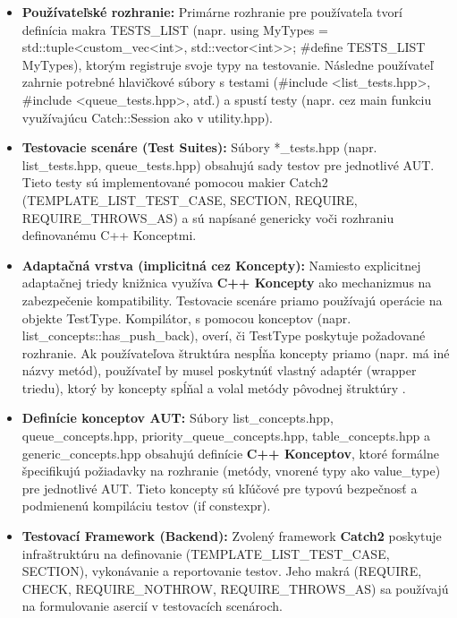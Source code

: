 \documentclass[11pt]{article}
\begin{document}
\begin{itemize}
    \item \textbf{Používateľské rozhranie:} Primárne rozhranie pre používateľa tvorí definícia makra TESTS\_LIST (napr. using MyTypes = std::tuple<custom\_vec<int>, std::vector<int>>; \#define TESTS\_LIST MyTypes), ktorým registruje svoje typy na testovanie. Následne používateľ zahrnie potrebné hlavičkové súbory s testami (\#include <list\_tests.hpp>, \#include <queue\_tests.hpp>, atď.) a spustí testy (napr. cez main funkciu využívajúcu Catch::Session ako v utility.hpp).
    \item \textbf{Testovacie scenáre (Test Suites):} Súbory *\_tests.hpp (napr. list\_tests.hpp, queue\_tests.hpp) obsahujú sady testov pre jednotlivé AUT. Tieto testy sú implementované pomocou makier Catch2 (TEMPLATE\_LIST\_TEST\_CASE, SECTION, REQUIRE, REQUIRE\_THROWS\_AS) a sú napísané genericky voči rozhraniu definovanému C++ Konceptmi.
    \item \textbf{Adaptačná vrstva (implicitná cez Koncepty):} Namiesto explicitnej adaptačnej triedy knižnica využíva \textbf{C++ Koncepty} ako mechanizmus na zabezpečenie kompatibility. Testovacie scenáre priamo používajú operácie na objekte TestType. Kompilátor, s pomocou konceptov (napr. list\_concepts::has\_push\_back), overí, či TestType poskytuje požadované rozhranie. Ak používateľova štruktúra nespĺňa koncepty priamo (napr. má iné názvy metód), používateľ by musel poskytnúť vlastný adaptér (wrapper triedu), ktorý by koncepty spĺňal a volal metódy pôvodnej štruktúry \cite{design_patterns}.
    \item \textbf{Definície konceptov AUT:} Súbory list\_concepts.hpp, queue\_concepts.hpp, priority\_queue\_concepts.hpp, table\_concepts.hpp a generic\_concepts.hpp obsahujú definície \textbf{C++ Konceptov}, ktoré formálne špecifikujú požiadavky na rozhranie (metódy, vnorené typy ako value\_type) pre jednotlivé AUT. Tieto koncepty sú kľúčové pre typovú bezpečnosť a podmienenú kompiláciu testov (if constexpr).
    \item \textbf{Testovací Framework (Backend):} Zvolený framework \textbf{Catch2} poskytuje infraštruktúru na definovanie (TEMPLATE\_LIST\_TEST\_CASE, SECTION), vykonávanie a reportovanie testov. Jeho makrá (REQUIRE, CHECK, REQUIRE\_NOTHROW, REQUIRE\_THROWS\_AS) sa používajú na formulovanie asercií v testovacích scenároch.
\end{itemize}
\end{document}
